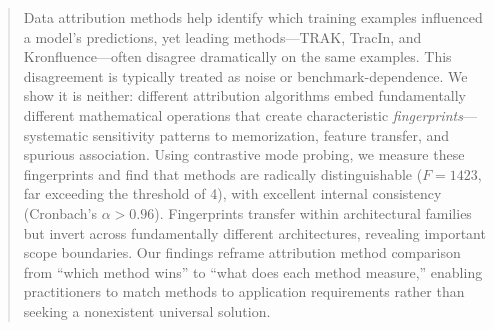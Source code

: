 \begin{abstract}
Data attribution methods help identify which training examples influenced a model's predictions, yet leading methods---TRAK, TracIn, and Kronfluence---often disagree dramatically on the same examples. This disagreement is typically treated as noise or benchmark-dependence. We show it is neither: different attribution algorithms embed fundamentally different mathematical operations that create characteristic \emph{fingerprints}---systematic sensitivity patterns to memorization, feature transfer, and spurious association. Using contrastive mode probing, we measure these fingerprints and find that methods are radically distinguishable ($F=1423$, far exceeding the threshold of 4), with excellent internal consistency (Cronbach's $\alpha > 0.96$). Fingerprints transfer within architectural families but invert across fundamentally different architectures, revealing important scope boundaries. Our findings reframe attribution method comparison from ``which method wins'' to ``what does each method measure,'' enabling practitioners to match methods to application requirements rather than seeking a nonexistent universal solution.
\end{abstract}
